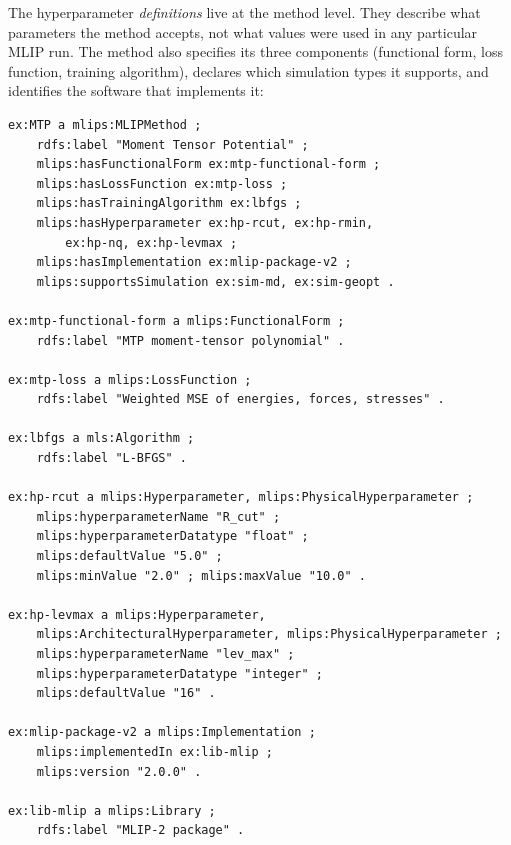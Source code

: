\noindent
The hyperparameter \emph{definitions} live at the method level. They
describe what parameters the method accepts, not what values were
used in any particular MLIP run. The method also specifies its three
components (functional form, loss function, training algorithm),
declares which simulation types it supports, and identifies the
software that implements it:
%
\begin{lstlisting}[language=turtle,caption={MTP method: components, hyperparameter definitions, and implementation.},label=lst:algorithm]
ex:MTP a mlips:MLIPMethod ;
    rdfs:label "Moment Tensor Potential" ;
    mlips:hasFunctionalForm ex:mtp-functional-form ;
    mlips:hasLossFunction ex:mtp-loss ;
    mlips:hasTrainingAlgorithm ex:lbfgs ;
    mlips:hasHyperparameter ex:hp-rcut, ex:hp-rmin,
        ex:hp-nq, ex:hp-levmax ;
    mlips:hasImplementation ex:mlip-package-v2 ;
    mlips:supportsSimulation ex:sim-md, ex:sim-geopt .

ex:mtp-functional-form a mlips:FunctionalForm ;
    rdfs:label "MTP moment-tensor polynomial" .

ex:mtp-loss a mlips:LossFunction ;
    rdfs:label "Weighted MSE of energies, forces, stresses" .

ex:lbfgs a mls:Algorithm ;
    rdfs:label "L-BFGS" .

ex:hp-rcut a mlips:Hyperparameter, mlips:PhysicalHyperparameter ;
    mlips:hyperparameterName "R_cut" ;
    mlips:hyperparameterDatatype "float" ;
    mlips:defaultValue "5.0" ;
    mlips:minValue "2.0" ; mlips:maxValue "10.0" .

ex:hp-levmax a mlips:Hyperparameter,
    mlips:ArchitecturalHyperparameter, mlips:PhysicalHyperparameter ;
    mlips:hyperparameterName "lev_max" ;
    mlips:hyperparameterDatatype "integer" ;
    mlips:defaultValue "16" .

ex:mlip-package-v2 a mlips:Implementation ;
    mlips:implementedIn ex:lib-mlip ;
    mlips:version "2.0.0" .

ex:lib-mlip a mlips:Library ;
    rdfs:label "MLIP-2 package" .
\end{lstlisting}

